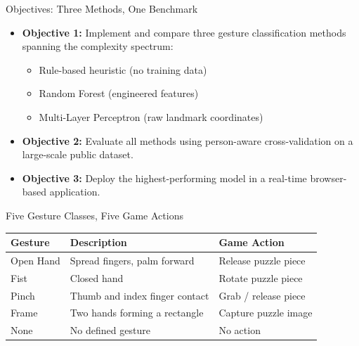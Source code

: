 \documentclass[10pt, aspectratio=169]{beamer}
\begin{document}
\begin{frame}{Objectives: Three Methods, One Benchmark}
    \begin{itemize}
        \item \textbf{Objective 1:} Implement and compare three gesture classification methods spanning the complexity spectrum:
        \begin{itemize}
            \item Rule-based heuristic (no training data)
            \item Random Forest (engineered features)
            \item Multi-Layer Perceptron (raw landmark coordinates)
        \end{itemize}
        \item \textbf{Objective 2:} Evaluate all methods using person-aware cross-validation on a large-scale public dataset.
        \item \textbf{Objective 3:} Deploy the highest-performing model in a real-time browser-based application.
    \end{itemize}
    \vspace{0.3cm}
    \centering
\end{frame}

\begin{frame}{Five Gesture Classes, Five Game Actions}
    \centering
    \begin{table}
        \begin{tabular}{@{}lll@{}}
            \toprule
            \textbf{Gesture} & \textbf{Description} & \textbf{Game Action} \\
            \midrule
            Open Hand & Spread fingers, palm forward & Release puzzle piece \\
            Fist & Closed hand & Rotate puzzle piece \\
            Pinch & Thumb and index finger contact & Grab / release piece \\
            Frame & Two hands forming a rectangle & Capture puzzle image \\
            None & No defined gesture & No action \\
            \bottomrule
        \end{tabular}
    \end{table}
\end{frame}
\end{document}
